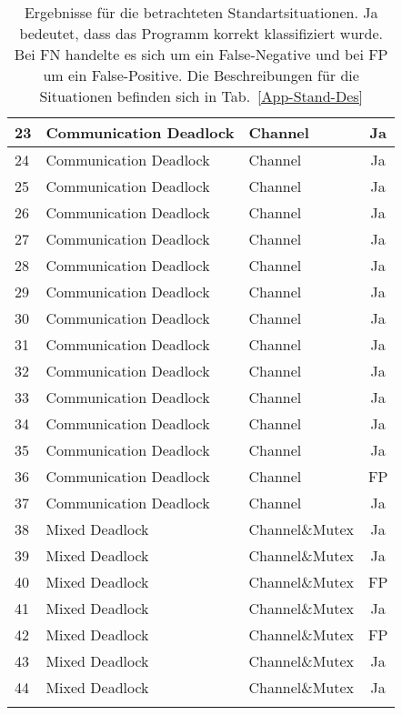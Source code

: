 \begin{longtable}[h]{|l|l|l|c|}
  23 & Communication Deadlock & Channel & Ja \\ \hline
  24 & Communication Deadlock & Channel & Ja \\ \hline
  25 & Communication Deadlock & Channel & Ja \\ \hline
  26 & Communication Deadlock & Channel & Ja \\ \hline
  27 & Communication Deadlock & Channel & Ja \\ \hline
  28 & Communication Deadlock & Channel & Ja \\ \hline
  29 & Communication Deadlock & Channel & Ja \\ \hline
  30 & Communication Deadlock & Channel & Ja \\ \hline
  31 & Communication Deadlock & Channel & Ja \\ \hline
  32 & Communication Deadlock & Channel & Ja \\ \hline
  33 & Communication Deadlock & Channel & Ja \\ \hline
  34 & Communication Deadlock & Channel & Ja \\ \hline
  35 & Communication Deadlock & Channel & Ja \\ \hline
  36 & Communication Deadlock & Channel & FP \\ \hline
  37 & Communication Deadlock & Channel & Ja \\ \hline
  38 & Mixed Deadlock & Channel\&Mutex & Ja \\ \hline
  39 & Mixed Deadlock & Channel\&Mutex & Ja \\ \hline
  40 & Mixed Deadlock & Channel\&Mutex & FP \\ \hline
  41 & Mixed Deadlock & Channel\&Mutex & Ja \\ \hline
  42 & Mixed Deadlock & Channel\&Mutex & FP \\ \hline
  43 & Mixed Deadlock & Channel\&Mutex & Ja \\ \hline
  44 & Mixed Deadlock & Channel\&Mutex & Ja \\ \hline
  \caption{Ergebnisse für die betrachteten Standartsituationen. Ja bedeutet, 
  dass das Programm korrekt klassifiziert wurde. Bei FN handelte es sich 
  um ein False-Negative und bei FP um ein False-Positive. Die Beschreibungen
  für die Situationen befinden sich in Tab.~\ref{App-Stand-Des}}
  \label{App-Stand-Res}
\end{longtable}



